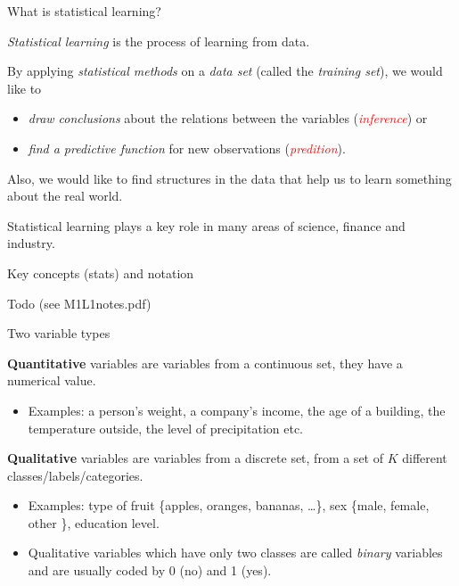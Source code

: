\documentclass[ignorenonframetext,]{beamer}
\providecommand{\tightlist}{%
  \setlength{\itemsep}{0pt}\setlength{\parskip}{0pt}}
\begin{document}
\begin{frame}{What is statistical learning?}

\emph{Statistical learning} is the process of learning from data.

By applying \emph{statistical methods} on a \emph{data set} (called the
\emph{training set}), we would like to

\begin{itemize}
\tightlist
\item
  \emph{draw conclusions} about the relations between the variables
  (\emph{\textcolor{red}{inference}}) or
\item
  \emph{find a predictive function} for new observations
  (\emph{\textcolor{red}{predition}}).
\end{itemize}

Also, we would like to find structures in the data that help us to learn
something about the real world.

Statistical learning plays a key role in many areas of science, finance
and industry.

\end{frame}

\begin{frame}{Key concepts (stats) and notation}

Todo (see M1L1notes.pdf)

\end{frame}

\begin{frame}

\begin{block}{Two variable types}

\vspace{2mm}

\textbf{Quantitative} variables are variables from a continuous set,
they have a numerical value.

\begin{itemize}
\tightlist
\item
  Examples: a person's weight, a company's income, the age of a
  building, the temperature outside, the level of precipitation etc.
\end{itemize}

\vspace{2mm}

\textbf{Qualitative} variables are variables from a discrete set, from a
set of \(K\) different classes/labels/categories.

\begin{itemize}
\item
  Examples: type of fruit \{apples, oranges, bananas, \ldots{}\}, sex
  \{male, female, other \}, education level.
\item
  Qualitative variables which have only two classes are called
  \emph{binary} variables and are usually coded by 0 (no) and 1 (yes).
\end{itemize}

\end{block}

\end{frame}
\end{document}
